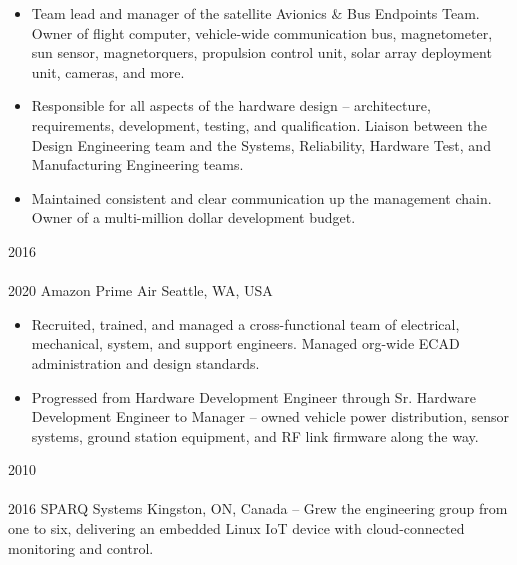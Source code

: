 \begin{entrylist}
{\begin{itemize}[leftmargin=12pt]
  \item Team lead and manager of the satellite Avionics \& Bus Endpoints Team. Owner of flight computer, vehicle-wide communication bus, magnetometer, sun sensor, magnetorquers, propulsion control unit, solar array deployment unit, cameras, and more.
  \item Responsible for all aspects of the hardware design -- architecture, requirements, development, testing, and qualification. Liaison between the Design Engineering team and the Systems, Reliability, Hardware Test, and Manufacturing Engineering teams.
  \item Maintained consistent and clear communication up the management chain. Owner of a multi-million dollar development budget.
\end{itemize}
}
\entry
  {2016\\\faChevronDown\\2020}
  {Amazon Prime Air}
  {Seattle, WA, USA}
  {
\begin{itemize}[leftmargin=12pt]
  \item Recruited, trained, and managed a cross-functional team of electrical, mechanical, system, and support engineers. Managed org-wide ECAD administration and design standards.
  \item Progressed from Hardware Development Engineer through Sr. Hardware Development Engineer to Manager -- owned vehicle power distribution, sensor systems, ground station equipment, and RF link firmware along the way.
\end{itemize}
}

\entry
  {2010\\\faChevronDown\\2016}
  {SPARQ Systems}
  {Kingston, ON, Canada}
  { -- Grew the engineering group from one to six, delivering an embedded Linux IoT device with cloud-connected monitoring and control.}

\end{entrylist}
